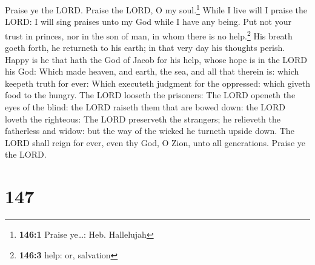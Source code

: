  Praise ye the LORD. Praise the LORD, O my
soul.\footnote{\textbf{146:1} Praise ye\ldots: Heb. Hallelujah}
 While I live will I praise the LORD: I will sing praises
unto my God while I have any being.  Put not your trust in
princes, nor in the son of man, in whom there is no help.\footnote{\textbf{146:3}
  help: or, salvation}  His breath goeth forth, he
returneth to his earth; in that very day his thoughts perish.
 Happy is he that hath the God of Jacob for his help,
whose hope is in the LORD his God:  Which made heaven, and
earth, the sea, and all that therein is: which keepeth truth for ever:
 Which executeth judgment for the oppressed: which giveth
food to the hungry. The LORD looseth the prisoners:  The
LORD openeth the eyes of the blind: the LORD raiseth them that are bowed
down: the LORD loveth the righteous:  The LORD preserveth
the strangers; he relieveth the fatherless and widow: but the way of the
wicked he turneth upside down.  The LORD shall reign for
ever, even thy God, O Zion, unto all generations. Praise ye the LORD.

\hypertarget{section-148}{%
\section{147}\label{section-148}}

